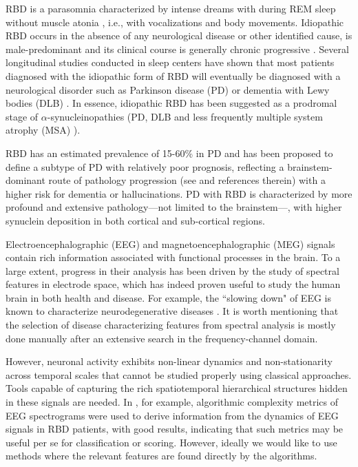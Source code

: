 \documentclass[review]{elsarticle}
\begin{document}
RBD is a parasomnia characterized by intense dreams with during REM sleep without muscle atonia \citep{iranzo:2014aa}, i.e., with vocalizations and body movements. Idiopathic RBD occurs in the absence of any neurological disease or other identified cause, is male-predominant and its clinical course is generally chronic progressive \citep{Fulda:2011aa}. Several longitudinal studies conducted in sleep centers have shown that most patients diagnosed with the idiopathic form of RBD will eventually be diagnosed with a neurological disorder such as Parkinson disease (PD) or dementia with Lewy bodies (DLB) \citep{postuma:2009aa,Fulda:2011aa,iranzo:2014aa,Hogl:2018aa}. In essence, idiopathic RBD has been suggested as a prodromal stage of $\alpha$-synucleinopathies (PD, DLB and less frequently multiple system atrophy (MSA) \citep{iranzo:2014aa,Hogl:2018aa}).
 
 
RBD has an estimated prevalence of 15-60\% in PD and has been proposed to define a subtype of PD with relatively poor prognosis, reflecting a brainstem-dominant route of pathology progression (see \cite{Kim:2017aa} and references therein) with a higher risk for dementia or hallucinations. PD with RBD is characterized by more profound and extensive pathology---not limited to the brainstem---, with higher synuclein deposition in both cortical and sub-cortical regions.
 
 Electroencephalographic (EEG) and magnetoencephalographic (MEG) signals contain rich information associated with functional processes in the brain. To a large extent, progress in their analysis has been driven by the study of spectral features in electrode space, which has indeed proven useful to study the human brain in both health and disease. For example, the ``slowing down" of EEG is known to characterize neurodegenerative diseases \cite{Fantini:2003aa,Brazete:2016aa,Ruffini:2017ac}.  It is worth mentioning that the selection of disease characterizing features from spectral analysis is mostly done manually after an extensive search in the frequency-channel domain.
 
 However, neuronal activity exhibits non-linear dynamics and non-stationarity across temporal scales that cannot be studied properly using classical approaches.
Tools capable of capturing the rich spatiotemporal hierarchical structures hidden in these signals are needed. 
 In \cite{Ruffini:2017ac}, for example, algorithmic complexity metrics of EEG spectrograms were used to derive information from the dynamics of EEG signals in RBD patients, with good results, indicating that such metrics may be useful per se for classification or scoring. However, ideally we would like to use methods where the relevant features are found directly by the algorithms. 
 
\end{document}
